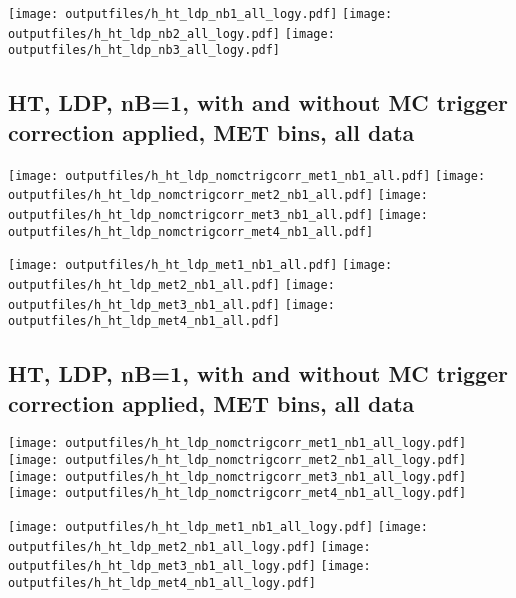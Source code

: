 \documentclass[11pt]{article}
\begin{document}
    \noindent
     \texttt{[image: outputfiles/h\_ht\_ldp\_nb1\_all\_logy.pdf]}
     \texttt{[image: outputfiles/h\_ht\_ldp\_nb2\_all\_logy.pdf]}
     \texttt{[image: outputfiles/h\_ht\_ldp\_nb3\_all\_logy.pdf]}

     \subsection{ HT, LDP, nB=1, with and without MC trigger correction applied, MET bins, all data}

    \noindent
     \texttt{[image: outputfiles/h\_ht\_ldp\_nomctrigcorr\_met1\_nb1\_all.pdf]}
     \texttt{[image: outputfiles/h\_ht\_ldp\_nomctrigcorr\_met2\_nb1\_all.pdf]}
     \texttt{[image: outputfiles/h\_ht\_ldp\_nomctrigcorr\_met3\_nb1\_all.pdf]}
     \texttt{[image: outputfiles/h\_ht\_ldp\_nomctrigcorr\_met4\_nb1\_all.pdf]}

    \noindent
     \texttt{[image: outputfiles/h\_ht\_ldp\_met1\_nb1\_all.pdf]}
     \texttt{[image: outputfiles/h\_ht\_ldp\_met2\_nb1\_all.pdf]}
     \texttt{[image: outputfiles/h\_ht\_ldp\_met3\_nb1\_all.pdf]}
     \texttt{[image: outputfiles/h\_ht\_ldp\_met4\_nb1\_all.pdf]}

   \clearpage
     \subsection{ HT, LDP, nB=1, with and without MC trigger correction applied, MET bins, all data}

    \noindent
     \texttt{[image: outputfiles/h\_ht\_ldp\_nomctrigcorr\_met1\_nb1\_all\_logy.pdf]}
     \texttt{[image: outputfiles/h\_ht\_ldp\_nomctrigcorr\_met2\_nb1\_all\_logy.pdf]}
     \texttt{[image: outputfiles/h\_ht\_ldp\_nomctrigcorr\_met3\_nb1\_all\_logy.pdf]}
     \texttt{[image: outputfiles/h\_ht\_ldp\_nomctrigcorr\_met4\_nb1\_all\_logy.pdf]}

    \noindent
     \texttt{[image: outputfiles/h\_ht\_ldp\_met1\_nb1\_all\_logy.pdf]}
     \texttt{[image: outputfiles/h\_ht\_ldp\_met2\_nb1\_all\_logy.pdf]}
     \texttt{[image: outputfiles/h\_ht\_ldp\_met3\_nb1\_all\_logy.pdf]}
     \texttt{[image: outputfiles/h\_ht\_ldp\_met4\_nb1\_all\_logy.pdf]}
\end{document}

